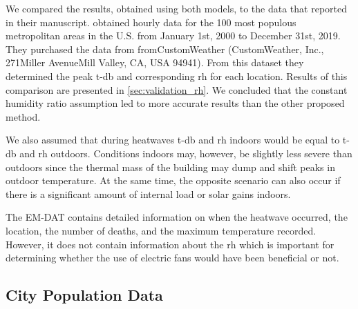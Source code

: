 We compared the results, obtained using both models, to the data that  reported in their manuscript.
 obtained hourly data for the 100 most populous metropolitan areas in the U.S. from January 1st, 2000 to December 31st, 2019.
They purchased the data from fromCustomWeather (CustomWeather, Inc., 271Miller AvenueMill Valley, CA, USA 94941).
From this dataset they determined the peak \ac{t-db} and corresponding \ac{rh} for each location.
Results of this comparison are presented in \ref{sec:validation_rh}.
We concluded that the constant humidity ratio assumption led to more accurate results than the other proposed method.

We also assumed that during heatwaves \ac{t-db} and \ac{rh} indoors would be equal to \ac{t-db} and \ac{rh} outdoors.
Conditions indoors may, however, be slightly less severe than outdoors since the thermal mass of the building may dump and shift peaks in outdoor temperature.
At the same time, the opposite scenario can also occur if there is a significant amount of internal load or solar gains indoors.

The EM-DAT contains detailed information on when the heatwave occurred, the location, the number of deaths, and the maximum temperature recorded.
However, it does not contain information about the \ac{rh} which is important for determining whether the use of electric fans would have been beneficial or not.

\subsection{City Population Data}\label{subsec:population-data}

